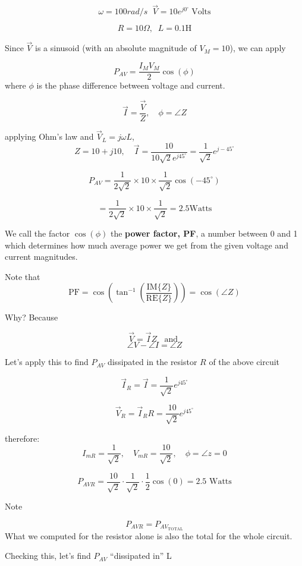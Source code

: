 \[
\omega = 100 rad/s\;\; \vec{V} = 10 e^{j 0^\circ} \; \mathrm{Volts}
\]

\[
R = 10 \Omega,\;\; L = 0.1 \text{H}
\]

\noindent Since $\vec V$ is a sinusoid (with an absolute magnitude of
$V_M=10$), we can apply

\[
P_{AV} = \frac{I_M V_M}{2} \cos(\phi)
\]
where $\phi$ is the phase difference between voltage  and current.

\[
\vec{I} = \frac{\vec{V}}{Z},  \quad \phi = \angle{Z}
\]

applying Ohm's law and $\vec V_L = j\omega L$,
\[
Z = 10 + j10, \quad \vec{I} = \frac{10}{10\sqrt{2} e^{j45^\circ}} = \frac{1}{\sqrt{2}} e^{j-45^\circ}
\]

\[
P_{AV} = \frac{1}{2\sqrt{2}} \times 10 \times \frac{1}{\sqrt{2}} \cos(-45^\circ )
\]

\[
= \frac{1}{2\sqrt{2}} \times 10 \times \frac{1}{\sqrt{2}} = 2.5
\text{Watts}
\]

We call the factor $\cos(\phi)$ the {\bf power factor, PF}, a number
between 0 and 1 which determines how much average power we get from the
given voltage and current magnitudes.

Note that
\[
\mathrm{PF} = \cos\left(\tan^{-1}\left ( \frac {\mathrm{IM}\{Z\} }  {\mathrm{RE}\{Z\}}  \right ) \right) = \cos\left ( \angle{Z}\right )
\]
%
%
%

\noindent Why?  Because

\[
\vec{V} = \vec{I} Z\;\; \text{ and }
\]
\[
\angle V - \angle I = \angle Z
\]

Let's apply this to
find $P_{AV}$ dissipated in the resistor $R$ of the above circuit

\[
\vec{I}_R = \vec{I} = \frac{1}{\sqrt{2}} e^{j45^\circ}
\]

\[
\vec{V}_R = \vec{I}_R R = \frac{10}{\sqrt{2}} e^{j45^\circ}
\]

therefore:
\[
 I_{mR} = \frac{1}{\sqrt{2}}, \quad V_{mR} = \frac{10}{\sqrt{2}}, \quad \phi = \angle z = 0
\]

\[
P_{AVR} = \frac{10}{\sqrt{2}} \cdot \frac{1}{\sqrt{2}} \cdot \frac{1}{2} \cos(0) = 2.5 \text{ Watts}
\]

\noindent Note

\[
P_{AVR} = P_{AV_{\text{TOTAL}}}
\]
What we computed for the resistor alone is also the total for
the whole circuit.

Checking this, let's find $P_{AV}$ ``dissipated in'' L

